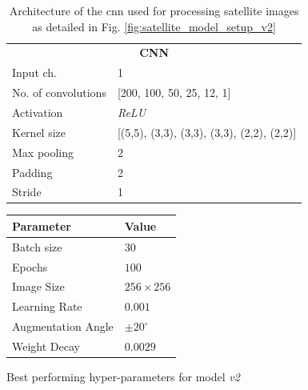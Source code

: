 \def\arraystretch{1.5}
\begin{table}[]
\begin{center}
\begin{tabular}{ll}
\multicolumn{2}{c}{\textbf{CNN}}                                                       \\
\multicolumn{1}{l|}{Input ch.}           & 1                                          \\ \hline
\multicolumn{1}{l|}{No. of convolutions} & [200, 100, 50, 25, 12, 1]                  \\ \hline
\multicolumn{1}{l|}{Activation}          & \emph{ReLU}                                       \\ \hline
\multicolumn{1}{l|}{Kernel size}         & [(5,5), (3,3), (3,3), (3,3), (2,2), (2,2)] \\ \hline
\multicolumn{1}{l|}{Max pooling}         & 2                                          \\ \hline
\multicolumn{1}{l|}{Padding}             & 2                                          \\ \hline
\multicolumn{1}{l|}{Stride}              & 1                                         
\end{tabular}
\end{center}
\caption{Architecture of the \gls{cnn} used for processing satellite images as detailed in Fig. \ref{fig:satellite_model_setup_v2}}\label{tab:cnn_structure}
\end{table}



\begin{margintable}
\begin{tabular}{@{}ll@{}}
\toprule
\textbf{Parameter} & \textbf{Value}   \\ \midrule
Batch size         & $30$             \\
Epochs             & $100$            \\
Image Size         & $256 \times 256$ \\
Learning Rate      & $0.001$            \\
Augmentation Angle & $\pm 20^{\circ}$ \\
Weight Decay       & $0.0029$         \\ \bottomrule
\end{tabular}
\caption{Best performing hyper-parameters for model \emph{v2}}\label{tab:hyperparam_rest}
\end{margintable}


